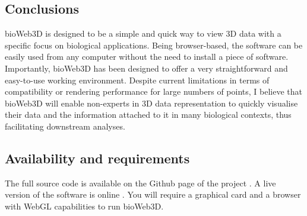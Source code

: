 	\subsection{Conclusions}
bioWeb3D is designed to be a simple and quick way to view 3D data with a specific focus on biological applications.  Being browser-based, the software can be easily used from any computer without the need to install a piece of software. Importantly, bioWeb3D has been designed to offer a very straightforward and easy-to-use working environment. Despite current limitations in terms of compatibility or rendering performance for large numbers of points, I believe that bioWeb3D will enable non-experts in 3D data representation to quickly visualise their data and the information attached to it in many biological contexts, thus facilitating downstream analyses.

	\subsection{Availability and requirements}
The full source code is available on the Github page of the project \citep{github}. A live version of the software is online \citep{bioWeb3D}. You will require a graphical card and a browser with WebGL capabilities to run bioWeb3D.

